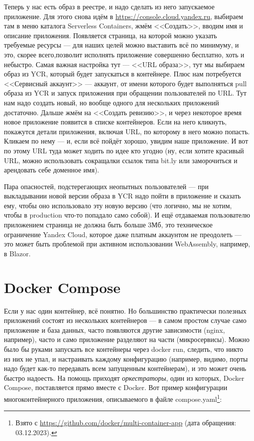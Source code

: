\documentclass{../../text-style}
\begin{document}
Теперь у нас есть образ в реестре, и надо сделать из него запускаемое приложение. Для этого снова идём в \url{https://console.cloud.yandex.ru}, выбираем там в меню каталога Serverless Containers, жмём <<Создать>>, вводим имя и описание приложения. Появляется страница, на которой можно указать требуемые ресурсы --- для наших целей можно выставить всё по минимуму, и это, скорее всего,позволит исполнять приложение совершенно бесплатно, хоть и небыстро. Самая важная настройка тут --- <<URL образа>>, тут мы выбираем образ из YCR, который будет запускаться в контейнере. Плюс нам потребуется <<Сервисный аккаунт>> --- аккаунт, от имени которого будет выполняться pull образа из YCR и запуск приложения при обращении пользователей по URL. Тут нам надо создать новый, но вообще одного для нескольких приложений достаточно. Дальше жмём на <<Создать ревизию>>, и через некоторое время новое приложение появится в списке контейнеров. Если на него кликнуть, покажутся детали приложения, включая URL, по которому в него можно попасть. Кликаем по нему --- и, если всё пойдёт хорошо, увидим наше приложение. И вот по этому URL туда может ходить по идее кто угодно (ну, если хотите красивый URL, можно использовать сокращалки ссылок типа bit.ly или заморочиться и арендовать себе доменное имя).

Пара опасностей, подстерегающих неопытных пользователей --- при выкладывании новой версии образа в YCR надо пойти в приложение и сказать ему, чтобы оно использовало эту новую версию (что логично, мы не хотим, чтобы в production что-то попадало само собой). И ещё отдаваемая пользователю приложением страница не должна быть больше 3Мб, это техническое ограничение Yandex Cloud, которое даже платным аккаунтом не преодолеть --- это может быть проблемой при активном использовании WebAssembly, например, в Blazor.

\section{Docker Compose}

Если у нас один контейнер, всё понятно. Но большинство практически полезных приложений состоят из нескольких контейнеров --- в самом простом случае само приложение и база данных, часто появляются другие зависимости (nginx, например), часто и само приложение разделяют на части (микросервисы). Можно было бы руками запускать все контейнеры через docker run, следить, что никто из них не упал, и настраивать каждому конфигурацию (например, видимо, порты надо будет как-то передавать всем запущенным контейнерам), и это может очень быстро надоесть. На помощь приходят \emph{оркестраторы}, один из которых, Docker Compose, поставляется прямо вместе с Docker. Вот пример конфигурации многоконтейнерного приложения, описываемого в файле compose.yaml\footnote{Взято с \url{https://github.com/docker/multi-container-app} (дата обращения: 03.12.2023).}: 
\end{document}
